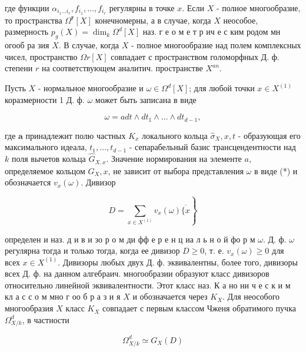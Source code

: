 \documentclass[10pt]{article}
\begin{document}
где функции $\alpha_{i_{1} \ldots i_{r}}, f_{i_{1}}, \ldots, f_{i_{r}}$ регулярны в точке $x$. Если $X$ - полное многообразие, то пространства $\Omega^{\boldsymbol{r}}[X]$ конечномерны, а в случае, когда $X$ неособое, размерность $p_{g}(X)=\operatorname{dim}_{k} \Omega^{d}[X]$ наз. г е о м е т р ич е с ким родом мн огооб ра зия $X$. В случае, когда $X$ - полное многообразие над полем комплексных чисел, пространство $\Omega r[X]$ совпадает с пространством голоморфных Д. ф. степени $r$ на соответствующем аналитич. пространстве $X^{a n}$.



Пусть $X$ - нормальное многообразие и $\omega \in \Omega^{d}[X]$; для любой точки $x \in X^{(1)}$ коразмерности 1 Д. ф. $\omega$ может быть записана в виде



\[

\omega=a d t \wedge d t_{1} \wedge \ldots \wedge d t_{d-1},

\]



где $\boldsymbol{a}$ принадлежит полю частных $K_{x}$ локального кольца $\hat{\sigma}_{X}, x, t$ - образующая его максимального идеала, $t_{1}, \ldots, t_{d-1}$ - сепарабельный базис трансцендентности над $k$ поля вычетов кольца $\widehat{G}_{X, x}$. Значение нормирования на элементе $a$, определяемое кольцом $G_{X}, x$, не зависит от выбора представления $\omega$ в виде (*) и обозначается $v_{x}(\omega)$. Дивизор



\[

\left.D=\sum_{x \in X^{(1)}} v_{x}(\omega) \overline{\{x}\right\}

\]



определен и наз. д и в и зо р о м ди фф е р е н ц иа л ь н о й фо р м $\omega$. Д. ф. $\omega$ регулярна тогда и только тогда, когда ее дивизор $D \geqslant 0$, т. е. $v_{x}(\omega) \geqslant 0$ для всех $x \in X^{(1)}$. Дивизоры любых двух Д. ф. эквивалентны, более того, дивизоры всех Д. ф. на данном алгебраич. многообразии образуют класс дивизоров относительно линейной эквивалентности. Этот класс наз. К а но ни ч е с к и м кл а с с о м мно г оо б р а з и я $X$ и обозначается через $K_{X}$. Для неособого многообразия $X$ класс $K_{X}$ совпадает с первым классом Чженя обратимого пучка $\Omega_{X / k}^{d}$, в частности



\[

\Omega_{X / k}^{d} \simeq G_{X}(D)

\]
\end{document}
